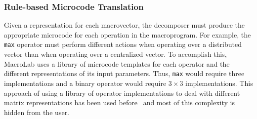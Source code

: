 \subsubsection{Rule-based Microcode Translation}\label{sect:codeTranslation}

Given a representation for each macrovector, the decomposer must produce the
appropriate microcode for each operation in the macroprogram. For example, the
{\tt max} operator must perform different actions when operating over a
distributed vector than when operating over a centralized vector.  To accomplish
this, MacroLab uses a library of microcode templates for each operator and the
different representations of its input parameters.  Thus, {\tt max} would
require three implementations and a binary operator would require $3 \times 3$
implementations. This approach of using a library of operator implementations to
deal with different matrix representations has been used before~\cite{Chang} and
most of this complexity is hidden from the user.

